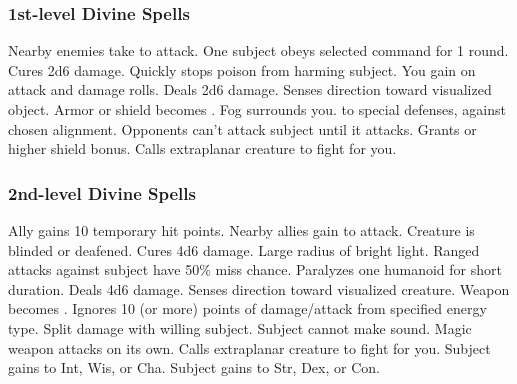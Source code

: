 \subsubsection{1st-level Divine Spells}
\begin{spelllist}
     Nearby enemies take  to attack.
     One subject obeys selected command for 1 round.
     Cures 2d6 damage.
     Quickly stops poison from harming subject.
     You gain  on attack and damage rolls.
     Deals 2d6 damage.
     Senses direction toward visualized object.
     Armor or shield becomes .
     Fog surrounds you.
      to special defenses,  against chosen alignment.
     Opponents can't attack subject until it attacks.
     Grants  or higher shield bonus.
     Calls extraplanar creature to fight for you.
\end{spelllist}

\subsubsection{2nd-level Divine Spells}
\begin{spelllist}
     Ally gains 10 temporary hit points.
     Nearby allies gain  to attack.
     Creature is blinded or deafened.
     Cures 4d6 damage.
     Large radius of bright light.
     Ranged attacks against subject have 50\% miss chance.
     Paralyzes one humanoid for short duration.
     Deals 4d6 damage.
     Senses direction toward visualized creature.
     Weapon becomes .
     Ignores 10 (or more) points of damage/attack from specified energy type.
      Split damage with willing subject.
     Subject cannot make sound.
     Magic weapon attacks on its own.
     Calls extraplanar creature to fight for you.
     Subject gains  to Int, Wis, or Cha.
     Subject gains  to Str, Dex, or Con.
\end{spelllist}

